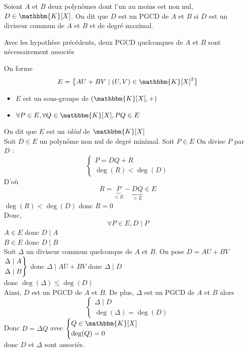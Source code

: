 \begin{defn}
	Soient $A$ et $B$ deux polynômes dont l'un au moins est non nul, $D \in \mathbbm{K}[X]$. On dit que $D$ est un PGCD de $A$ et $B$ si $D$ est un diviseur commun de $A$ et $B$ et de degré maximal.
\end{defn}

\begin{prop}
	Avec les hypothèse précédents, deux PGCD quelconques de $A$ et $B$ sont nécessairement associés
\end{prop}

\begin{prv}
	On forme \[
		E = \big\{AU + BV \mid (U,V) \in \mathbbm{K}[X]^2 \big\} 
	\]
	\begin{itemize}
		\item $E$ est un sous-groupe de $(\mathbbm{K}[X], +)$
		\item $\forall P \in E, \forall Q \in \mathbbm{K}[X], PQ \in E$
	\end{itemize}
	{On dit que $E$ est un {\em idéal} de $\mathbbm{K}[X]$}\\

	Soit $D \in E$ un polynôme non nul de degré minimal. Soit $P \in E$ On divise $P$ par $D$ : \[
		\begin{cases}
			P = DQ + R\\
			\deg(R) < \deg(D)
		\end{cases}
	\]
	D'où \[
		R = \underbrace{P}_{\in E} - \underbrace{DQ}_{\in E} \in E
	\] $\deg(R) < \deg(D)$ donc $R = 0$\\
	Donc,  \[
		\forall P \in E, D \mid P
	\]
	$A \in E$ donc $D \mid A$ \\
	$B \in E$ donc $D \mid B$ \\

	Soit $\Delta$ un diviseur commun quelconque de $A$ et $B$. On pose $D = AU + BV$ \\
	$\begin{rcases*}
		\Delta \mid A\\
		\Delta \mid B
	\end{rcases*}$ donc $\Delta  \mid  AU + BV$ donc $\Delta  \mid  D$\\
	donc $\deg(\Delta) \le \deg(D)$\\

	Ainsi, $D$ est un PGCD de $A$ et $B$. De plus, $\Delta$ est un PGCD de $A$ et $B$ alors \[
		\begin{cases}
			\Delta  \mid D\\
			\deg(\Delta) = \deg(D)
		\end{cases}
	\] Donc $D = \Delta Q$ avec $\begin{cases}
		Q \in \mathbbm{K}[X]\\
		\deg(Q) = 0
	\end{cases}$\\
	donc $D$ et $\Delta$ sont associés.
\end{prv}

